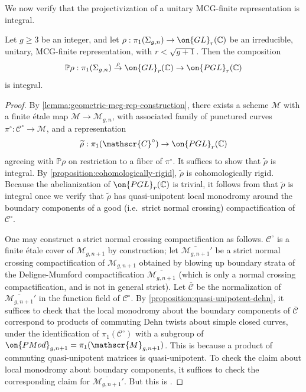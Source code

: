 We now verify that the projectivization of a unitary MCG-finite representation is integral.
\begin{lemma}
\notready
	\label{lemma:defined-over-number-field}
	Let $g\geq 3$ be an integer, and let $\rho: \pi_1(\Sigma_{g,n})\to \on{GL}_r(\mathbb{C})$ be an irreducible, unitary, MCG-finite representation, with $r<\sqrt{g+1}$. Then the composition $$\mathbb{P}\rho: \pi_1(\Sigma_{g,n})\overset{\rho}{\to} \on{GL}_r(\mathbb{C})\to \on{PGL}_r(\mathbb{C})$$ is integral.
\end{lemma}
\begin{proof}
By \autoref{lemma:geometric-mcg-rep-construction}, there exists a scheme $\mathscr{M}$ with a finite \'etale map $\mathscr{M}\to \mathscr{M}_{g,n}$, with associated family of punctured curves $\pi^\circ: \mathscr{C}^\circ\to \mathscr{M}$, and a representation $$\widetilde{\rho}: \pi_1(\mathscr{C}^\circ)\to \on{PGL}_r(\mathbb{C})$$ agreeing with $\mathbb{P}\rho$ on restriction to a fiber of $\pi^\circ$. It suffices to show that $\widetilde{\rho}$ is integral.
	By \autoref{proposition:cohomologically-rigid},
	$\widetilde{\rho}$ is cohomologically rigid.
	Because the abelianization of $\on{PGL}_r(\mathbb C)$ is
	trivial, it follows from
\cite[Theorem 1.2]{klevdalP:g-rigid-local-systems-are-integral}	that $\widetilde\rho$
is integral once we verify that $\widetilde\rho$ has quasi-unipotent local monodromy around the boundary components of
	a good (i.e.~strict normal crossing) compactification of $\mathscr{C}^\circ$.

One may construct a strict normal crossing compactification as follows.
$\mathscr{C}^\circ$ is a finite \'etale cover of $\mathscr{M}_{g,n+1}$ by
construction; let $\overline{\mathscr{M}_{g, n+1}}'$ be a strict normal crossing
compactification of $\mathscr{M}_{g,n+1}$ obtained by blowing up boundary strata
of the Deligne-Mumford compactification $\overline{\mathscr{M}_{g,n+1}}$ (which
is only a normal crossing compactification, and is not in general strict). Let
$\overline{\mathscr{C}}$ be the normalization of $\overline{\mathscr{M}_{g,
n+1}}'$ in the function field of $\mathscr{C}^\circ$. By
\autoref{proposition:quasi-unipotent-dehn}, it suffices to check that the local
monodromy about the boundary components of $\overline{\mathscr{C}}$ correspond
to products of commuting Dehn twists about simple closed curves, under the
identification of $\pi_1(\mathscr{C}^\circ)$ with a subgroup of
$\on{PMod}_{g,n+1}=\pi_1(\mathscr{M}_{g,n+1})$.
This is because a product of
commuting quasi-unipotent matrices is quasi-unipotent. To check the claim about
local monodromy about boundary components, it suffices to check the
corresponding claim for $\overline{\mathscr{M}_{g, n+1}}'$. But this is
\cite[Lemma 2.1.1]{li2020surface}.
\end{proof}

